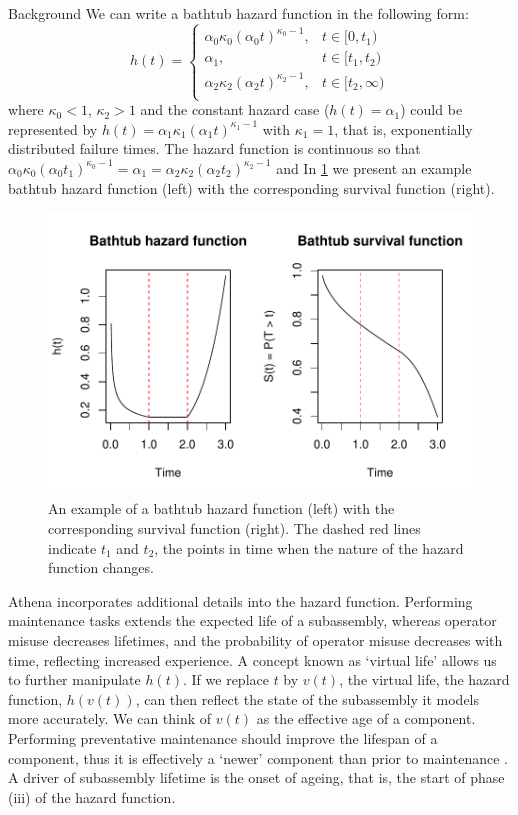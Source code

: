 \begin{chapter}{Background \label{Ch:background}}
We can write a bathtub hazard function in the following form:
\begin{equation}
h(t) = \begin{cases}
        \alpha_0 \kappa_0 (\alpha_0 t)^{\kappa_0 - 1},& t \in [0, t_1)\\
        \alpha_1,& t \in [t_1,t_2)\\
        \alpha_2 \kappa_2 (\alpha_2 t)^{\kappa_2 - 1},& t \in [t_2, \infty) \\
       \end{cases}
\end{equation}
where $\kappa_0 < 1$, $\kappa_2 > 1$ and the constant hazard case ($h(t) = \alpha_1$) could be represented by $h(t) = \alpha_1 \kappa_1 (\alpha_1 t)^{\kappa_1 - 1}$ with $\kappa_1 = 1$, that is, exponentially distributed failure times. The hazard function is continuous so that $\alpha_0 \kappa_0 (\alpha_0 t_1)^{\kappa_0 - 1} = \alpha_1 = \alpha_2 \kappa_2 (\alpha_2 t_2)^{\kappa_2 - 1}$ and  In \cref{Fig:bathtub} we present an example  bathtub hazard function (left) with the corresponding survival function (right).
\begin{figure}
  \centering
  \includegraphics{fig-background/bathtub.pdf}
  \caption{An example of a bathtub hazard function (left) with the corresponding survival function (right). The dashed red lines indicate $t_1$ and $t_2$, the points in time when the nature of the hazard function changes. \label{Fig:bathtub}}
\end{figure}
Athena incorporates additional details into the hazard function. Performing maintenance tasks extends the expected life of a subassembly, whereas operator misuse decreases lifetimes, and the probability of operator misuse decreases with time, reflecting increased experience. A concept known as `virtual life' allows us to further manipulate $h(t)$. If we replace $t$ by $v(t)$, the virtual life, the hazard function, $h(v(t))$, can then reflect the state of the subassembly it models more accurately. We can think of $v(t)$ as the effective age of a component. Performing preventative maintenance should improve the lifespan of a component, thus it is effectively a `newer' component than prior to maintenance \citep{Finkelstein2007}. A driver of subassembly lifetime is the onset of ageing, that is, the start of phase (iii) of the hazard function.


\end{chapter}
